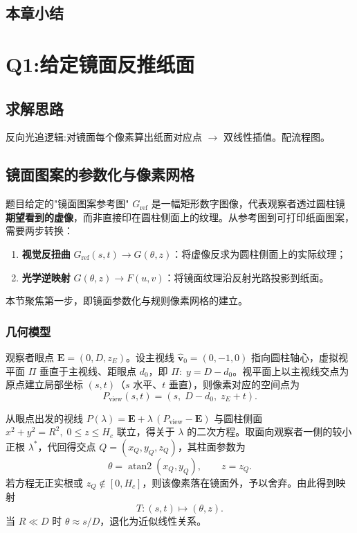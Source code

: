 \documentclass[12pt, a4paper]{ctexart}
\begin{document}
\subsection{本章小结}

\section{Q1:给定镜面反推纸面}
\subsection{求解思路}
反向光追逻辑:对镜面每个像素算出纸面对应点 $\rightarrow$ 双线性插值。配流程图。

\subsection{镜面图案的参数化与像素网格}

题目给定的"镜面图案参考图" $G_{\mathrm{ref}}$ 是一幅矩形数字图像，代表观察者透过圆柱镜\textbf{期望看到的虚像}，而非直接印在圆柱侧面上的纹理。从参考图到可打印纸面图案，需要两步转换：
\begin{enumerate}
    \item \textbf{视觉反扭曲} $G_{\mathrm{ref}}(s,t)\longrightarrow G(\theta,z)$：将虚像反求为圆柱侧面上的实际纹理；
    \item \textbf{光学逆映射} $G(\theta,z)\longrightarrow F(u,v)$：将镜面纹理沿反射光路投影到纸面。
\end{enumerate}
本节聚焦第一步，即镜面参数化与规则像素网格的建立。

\subsubsection{几何模型}

观察者眼点 $\mathbf{E}=(0,D,z_E)$。设主视线 $\hat{\mathbf{v}}_0=(0,-1,0)$ 指向圆柱轴心，虚拟视平面 $\Pi$ 垂直于主视线、距眼点 $d_0$，即 $\Pi:\;y=D-d_0$。视平面上以主视线交点为原点建立局部坐标 $(s,t)$（$s$ 水平、$t$ 垂直），则像素对应的空间点为
\[
P_{\mathrm{view}}(s,t)=(s,\;D-d_0,\;z_E+t).
\]

从眼点出发的视线 $P(\lambda)=\mathbf{E}+\lambda\,(P_{\mathrm{view}}-\mathbf{E})$ 与圆柱侧面 $x^2+y^2=R^2,\;0\leq z\leq H_c$ 联立，得关于 $\lambda$ 的二次方程。取面向观察者一侧的较小正根 $\lambda^{*}$，代回得交点 $Q=(x_Q,y_Q,z_Q)$，其柱面参数为
\[
\theta=\operatorname{atan2}(x_Q,y_Q),\qquad z=z_Q.
\]
若方程无正实根或 $z_Q\notin[0,H_c]$，则该像素落在镜面外，予以舍弃。由此得到映射
\[
T:(s,t)\longmapsto(\theta,z).
\]
当 $R\ll D$ 时 $\theta\approx s/D$，退化为近似线性关系。
\end{document}
